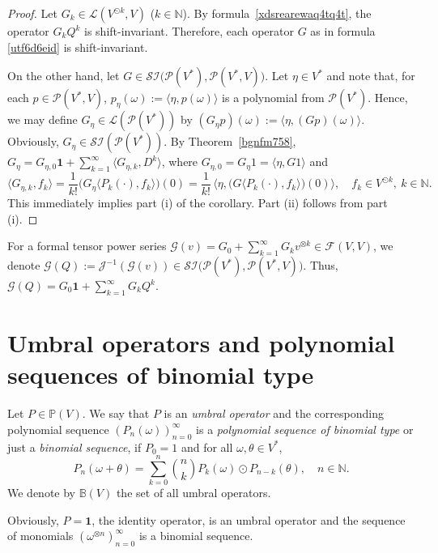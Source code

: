 \documentclass[12pt]{article}
\theoremstyle{remark}
\theoremstyle{remark}
\theoremstyle{remark}
\begin{document}
\begin{proof} Let $G_k\in \mathcal L(V^{\odot k},V)$ ($k\in \mathbb N$).  By formula~\eqref{xdsrearewaq4tq4t}, the operator $G_kQ^{k}$ is shift-invariant. Therefore, each operator $G$ as in formula \eqref{utf6d6eid} is shift-invariant. 

On the other hand, let $G \in  \mathcal{SI}\big(\mathcal P    (V^*),\mathcal P(V^*,V)\big)$. Let $\eta\in V^*$ and note that, for each $p\in\mathcal P(V^*,V)$, $p_\eta(\omega):=\langle\eta,p(\omega)\rangle$ is a polynomial from $\mathcal P(V^*)$. Hence, we may define $G_\eta\in\mathcal L(\mathcal P(V^*))$ by $(G_\eta p)(\omega):=\langle \eta, (Gp)(\omega)\rangle$. Obviously, $G_\eta\in \mathcal{SI}(\mathcal P    (V^*))$. By Theorem~\ref{bgnfm758}, $G_\eta=G_{\eta,0}\mathbf 1+\sum_{k=1}^\infty \langle G_{\eta,k},D^{k}\rangle$, where $G_{\eta,0}=G_\eta 1=\langle \eta,G1\rangle$ and 
\[
\langle G_{\eta,k}, f_k \rangle =\frac1{k!}\big(G_\eta\langle P_k(\cdot),f_k\rangle\big)(0)
=\frac1{k!}\,\big\langle\eta, \big(G\langle P_k(\cdot),f_k\rangle\big)(0)\big\rangle,\quad f_k\in V^{\odot   k},\ k\in\mathbb N.
\]  This immediately implies part (i) of the corollary. Part (ii) follows from part (i). 
\end{proof}

 For a formal tensor power series $\mathcal G(v)=G_0+\sum_{k=1}^\infty G_kv^{\otimes k}\in \mathcal F(V,V)$, we denote  $\mathcal G(Q):=\mathcal J^{-1}(\mathcal G(v))\in \mathcal{SI}\big(\mathcal P  (V^*),\mathcal P(V^*,V)\big)$. Thus, $\mathcal G(Q)=G_0\mathbf 1+\sum_{k=1}^\infty G_kQ^k$. 


\section{Umbral operators and polynomial sequences of binomial type}\label{cgfdxyrdrek}

Let $P\in\mathbb P(V)$. We say that $P$ is an {\it umbral operator} and the corresponding polynomial sequence $(P_n(\omega))_{n=0}^\infty$ is a {\it polynomial sequence of binomial type} or just a {\it binomial sequence}, if $P_0=1$ and for all $\omega, \theta \in V^*$,
\begin{equation}\label{xSSX65Q}P_n(\omega+\theta)=\sum_{k=0}^n{{n}\choose{k}}P_k(\omega)\odot P_{n-k}(\theta),\quad n\in\mathbb N.\end{equation}
We denote by $\mathbb B(V)$ the set of all umbral operators.

Obviously, $P=\mathbf 1$, the identity operator, is an umbral operator and the sequence of monomials $(\omega^{\otimes n})_{n=0}^\infty$ is a binomial sequence.
\end{document}
